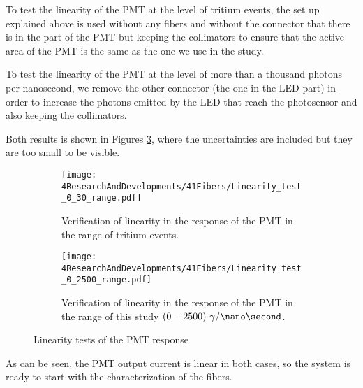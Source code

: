 To test the linearity of the PMT at the level of tritium events, the set up explained above is used without any fibers and without the connector that there is in the part of the PMT but keeping the collimators to ensure that the active area of the PMT is the same as the one we use in the study. 

To test the linearity of the PMT at the level of more than a thousand photons per nanosecond, we remove the other connector (the one in the LED part) in order to increase the photons emitted by the LED that reach the photosensor and also keeping the collimators.

Both results is shown in Figures \ref{fig:LinearityRangesOfPMT}, where the uncertainties are included but they are too small to be visible.

\begin{figure}
\centering
    \begin{subfigure}[b]{0.8\textwidth}
    \centering
    \texttt{[image: 4ResearchAndDevelopments/41Fibers/Linearity\_test\_0\_30\_range.pdf]}  
    \caption{Verification of linearity in the response of the PMT in the range of tritium events.\label{subfig:LinearityTritiumRange}}
    \end{subfigure}
    \hfill
    \begin{subfigure}[b]{0.8\textwidth}
    \centering
    \texttt{[image: 4ResearchAndDevelopments/41Fibers/Linearity\_test\_0\_2500\_range.pdf]}  
    \caption{Verification of linearity in the response of the PMT in the range of this study  $(0-2500)~\gamma/\nano\second$.\label{subfig:LinearityStudyRange}}
    \end{subfigure}
 \caption{Linearity tests of the PMT response}
 \label{fig:LinearityRangesOfPMT}
\end{figure}

As can be seen, the PMT output current is linear in both cases, so the system is ready to start with the characterization of the fibers.